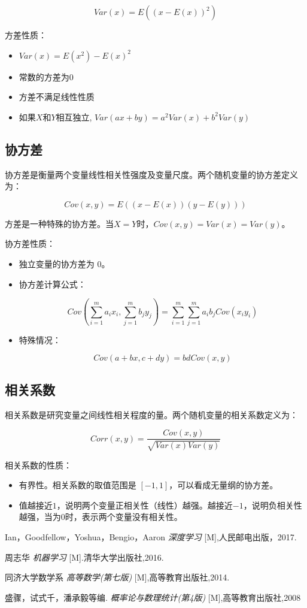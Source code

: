 $$
Var(x) = E((x-E(x))^2)
$$

方差性质：  

\begin{itemize}\itemsep0em
		\item $Var(x) = E(x^2) -E(x)^2$
		\item 常数的方差为0
		\item 方差不满足线性性质
		\item 如果$X$和$Y$相互独立, $Var(ax+by)=a^2Var(x)+b^2Var(y)$   
\end{itemize}

\subsection{协方差}

协方差是衡量两个变量线性相关性强度及变量尺度。两个随机变量的协方差定义为：

$$
Cov(x,y)=E((x-E(x))(y-E(y)))
$$

方差是一种特殊的协方差。当$X=Y$时，$Cov(x,y)=Var(x)=Var(y)$。

协方差性质：

\begin{itemize}\itemsep0em
		\item 独立变量的协方差为 $0$。  
		\item 协方差计算公式：

		$$
		Cov(\sum_{i=1}^{m}{a_ix_i}, \sum_{j=1}^{m}{b_jy_j}) = \sum_{i=1}^{m} \sum_{j=1}^{m}{a_ib_j Cov(x_iy_i)}
		$$

	\item 特殊情况：

		$$
		Cov(a+bx, c+dy) = bdCov(x, y)
		$$
\end{itemize}


\subsection{相关系数}

相关系数是研究变量之间线性相关程度的量。两个随机变量的相关系数定义为：

$$
Corr(x,y) = \frac{Cov(x,y)}{\sqrt{Var(x)Var(y)}}
$$

相关系数的性质：  

\begin{itemize}\itemsep0em
\item 有界性。相关系数的取值范围是 $[-1,1]$，可以看成无量纲的协方差。  
\item 值越接近$1$，说明两个变量正相关性（线性）越强。越接近$-1$，说明负相关性越强，当为$0$时，表示两个变量没有相关性。  
\end{itemize}

\begin{thebibliography}{9}
		Ian，Goodfellow，Yoshua，Bengio，Aaron
		{\it 深度学习}
		[M],人民邮电出版，2017.

		周志华
		{\it 机器学习}
		[M].清华大学出版社,2016.

		同济大学数学系
		{\it 高等数学(第七版)}
		[M],高等教育出版社,2014.


		盛骤，试式千，潘承毅等编.
		{\it 概率论与数理统计(第4版)}
		[M],高等教育出版社,2008
\end{thebibliography}
